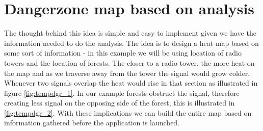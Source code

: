 \section{Dangerzone map based on analysis}
\label{sec:dgrzone}

The thought behind this idea is simple and easy to implement given we have the information needed to do the analysis. The idea is to design a heat map based on some sort of information - in this example we will be using location of radio towers and  the location of forests. The closer to a radio tower, the more heat on the map and as we traverse away from the tower the signal would grow colder. Whenever two signals overlap the heat would rise in that section as illustrated in figure \ref{fig:tempdgr_1}. In our example forests obstruct the signal, therefore creating less signal on the opposing side of the forest, this is illustrated in \ref{fig:tempdgr_2}. With these implications we can build the entire map based on information gathered before the application is launched. 

